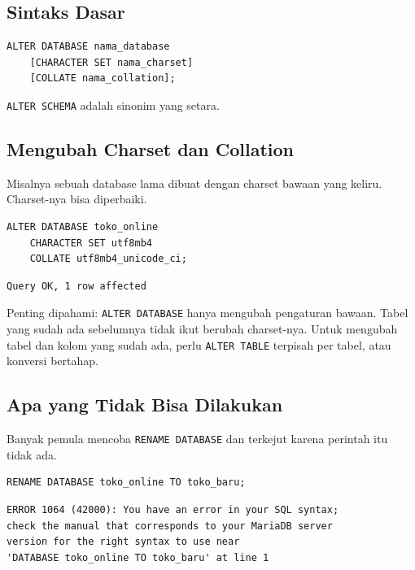 \documentclass[11pt,a4paper]{article}
\begin{document}
\subsection{Sintaks Dasar}

\begin{lstlisting}[style=code]
ALTER DATABASE nama_database
    [CHARACTER SET nama_charset]
    [COLLATE nama_collation];
\end{lstlisting}

\texttt{ALTER SCHEMA} adalah sinonim yang setara.

\subsection{Mengubah Charset dan Collation}

Misalnya sebuah database lama dibuat dengan charset bawaan yang keliru. Charset-nya bisa diperbaiki.

\begin{lstlisting}[style=code]
ALTER DATABASE toko_online
    CHARACTER SET utf8mb4
    COLLATE utf8mb4_unicode_ci;
\end{lstlisting}

\begin{lstlisting}[style=out]
Query OK, 1 row affected
\end{lstlisting}

Penting dipahami: \texttt{ALTER DATABASE} hanya mengubah pengaturan bawaan. Tabel yang sudah ada sebelumnya tidak ikut berubah charset-nya. Untuk mengubah tabel dan kolom yang sudah ada, perlu \texttt{ALTER TABLE} terpisah per tabel, atau konversi bertahap.

\subsection{Apa yang Tidak Bisa Dilakukan}

Banyak pemula mencoba \texttt{RENAME DATABASE} dan terkejut karena perintah itu tidak ada.

\begin{lstlisting}[style=code]
RENAME DATABASE toko_online TO toko_baru;
\end{lstlisting}

\begin{lstlisting}[style=out]
ERROR 1064 (42000): You have an error in your SQL syntax;
check the manual that corresponds to your MariaDB server
version for the right syntax to use near
'DATABASE toko_online TO toko_baru' at line 1
\end{lstlisting}
\end{document}
